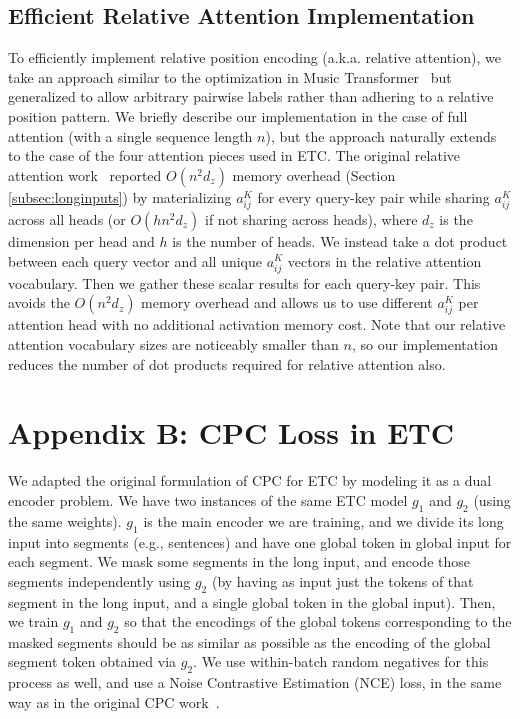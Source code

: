 \documentclass[11pt,a4paper]{article}
\begin{document}
\subsection*{Efficient Relative Attention Implementation}

To efficiently implement relative position encoding (a.k.a. relative attention), we take an approach similar to the optimization in Music Transformer~\cite{huang2018music} but generalized to allow arbitrary pairwise labels rather than adhering to a relative position pattern.  We briefly describe our implementation in the case of full attention (with a single sequence length $n$), but the approach naturally extends to the case of the four attention pieces used in ETC.  The original relative attention work~\cite{shaw2018self} reported $O(n^2d_z)$ memory overhead (Section \ref{subsec:longinputs}) by materializing $a_{ij}^K$ for every query-key pair while sharing $a_{ij}^K$ across all heads (or $O(hn^2d_z)$ if not sharing across heads), where $d_z$ is the dimension per head and $h$ is the number of heads.  We instead take a dot product between each query vector and all unique $a_{ij}^K$ vectors in the relative attention vocabulary.  Then we gather these scalar results for each query-key pair.  This avoids the $O(n^2d_z)$ memory overhead and allows us to use different $a_{ij}^K$ per attention head with no additional activation memory cost. Note that our relative attention vocabulary sizes are noticeably smaller than $n$, so our implementation reduces the number of dot products required for relative attention also.

\section*{Appendix B: CPC Loss in ETC}\label{app:cpc}

We adapted the original formulation of CPC for ETC by modeling it as a dual encoder problem. We have two instances of the same ETC model $g_{1}$ and $g_{2}$ (using the same weights). $g_{1}$ is the main encoder we are training, and we divide its long input into segments (e.g., sentences) and have one global token in global input for each segment. We mask some segments in the long input, and encode those segments independently using $g_{2}$ (by having as input just the tokens of that segment in the long input, and a single global token in the global input). Then, we train $g_{1}$ and $g_{2}$ so that the encodings of the global tokens corresponding to the masked segments should be as similar as possible as the encoding of the global segment token obtained via $g_{2}$. We use within-batch random negatives for this process as well, and use a Noise Contrastive Estimation (NCE) loss, in the same way as in the original CPC work~\cite{oord2018representation}.
\end{document}
